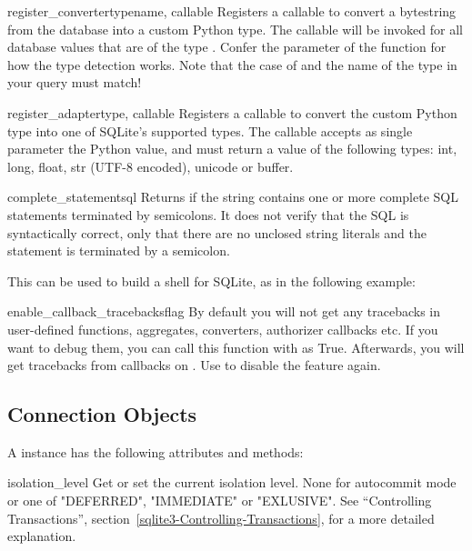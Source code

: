 \begin{funcdesc}{register_converter}{typename, callable}
Registers a callable to convert a bytestring from the database into a custom
Python type. The callable will be invoked for all database values that are of
the type . Confer the parameter  of the
 function for how the type detection works. Note that the case of
 and the name of the type in your query must match!
\end{funcdesc}

\begin{funcdesc}{register_adapter}{type, callable}
Registers a callable to convert the custom Python type  into one of
SQLite's supported types. The callable  accepts as single
parameter the Python value, and must return a value of the following types:
int, long, float, str (UTF-8 encoded), unicode or buffer.
\end{funcdesc}

\begin{funcdesc}{complete_statement}{sql}
Returns  if the string  contains one or more complete SQL
statements terminated by semicolons. It does not verify that the SQL is
syntactically correct, only that there are no unclosed string literals and the
statement is terminated by a semicolon.

This can be used to build a shell for SQLite, as in the following example:

    
\end{funcdesc}

\begin{funcdesc}{enable_callback_tracebacks}{flag}
By default you will not get any tracebacks in user-defined functions,
aggregates, converters, authorizer callbacks etc. If you want to debug them,
you can call this function with  as True. Afterwards, you will get
tracebacks from callbacks on . Use  to disable
the feature again.
\end{funcdesc}

\subsection{Connection Objects \label{sqlite3-Connection-Objects}}

A  instance has the following attributes and methods:

\label{sqlite3-Connection-IsolationLevel}
\begin{memberdesc}{isolation_level}
  Get or set the current isolation level. None for autocommit mode or one of
  "DEFERRED", "IMMEDIATE" or "EXLUSIVE". See ``Controlling Transactions'', 
  section~\ref{sqlite3-Controlling-Transactions}, for a more detailed explanation.
\end{memberdesc}

